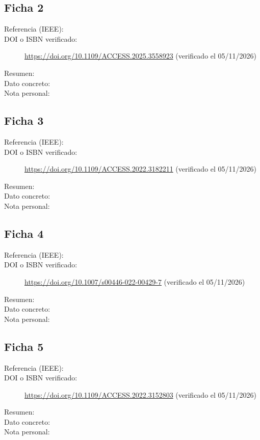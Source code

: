 \documentclass[11pt,a4paper]{article}
\begin{document}
\subsection{Ficha 2}
\begin{description}
  \item[Referencia (IEEE):] 
  \item[DOI o ISBN verificado:] \url{https://doi.org/10.1109/ACCESS.2025.3558923} (verificado el 05/11/2026)
  \item[Resumen:]
  \item[Dato concreto:]
  \item[Nota personal:]
\end{description}

\subsection{Ficha 3}
\begin{description}
  \item[Referencia (IEEE):] 
  \item[DOI o ISBN verificado:] \url{https://doi.org/10.1109/ACCESS.2022.3182211} (verificado el 05/11/2026)
  \item[Resumen:]
  \item[Dato concreto:]
  \item[Nota personal:]
\end{description}

\subsection{Ficha 4}
\begin{description}
  \item[Referencia (IEEE):] 
  \item[DOI o ISBN verificado:] \url{https://doi.org/10.1007/s00446-022-00429-7} (verificado el 05/11/2026)
  \item[Resumen:]
  \item[Dato concreto:]
  \item[Nota personal:]
\end{description}

\subsection{Ficha 5}
\begin{description}
  \item[Referencia (IEEE):] 
  \item[DOI o ISBN verificado:] \url{https://doi.org/10.1109/ACCESS.2022.3152803} (verificado el 05/11/2026)
  \item[Resumen:]
  \item[Dato concreto:]
  \item[Nota personal:]
\end{description}
\end{document}
